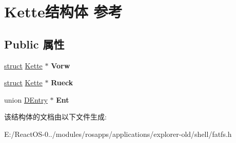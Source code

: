 \hypertarget{struct_kette}{}\section{Kette结构体 参考}
\label{struct_kette}
\subsection*{Public 属性}
\begin{DoxyCompactItemize}
\item 
\mbox{\label{struct_kette_ad68e1d651a0fd437b22ac577bb6ef3a0}} 
\hyperlink{interfacestruct}{struct} \hyperlink{struct_kette}{Kette} $\ast$ {\bfseries Vorw}
\item 
\mbox{\label{struct_kette_abb2ac1202d9ca169f84195ceab1074c7}} 
\hyperlink{interfacestruct}{struct} \hyperlink{struct_kette}{Kette} $\ast$ {\bfseries Rueck}
\item 
\mbox{\label{struct_kette_a7304c40750c850d660e901111d7ec3e4}} 
union \hyperlink{union_d_entry}{D\+Entry} $\ast$ {\bfseries Ent}
\end{DoxyCompactItemize}


该结构体的文档由以下文件生成\+:\begin{DoxyCompactItemize}
\item 
E\+:/\+React\+O\+S-\/0../modules/rosapps/applications/explorer-\/old/shell/fatfs.\+h\end{DoxyCompactItemize}
